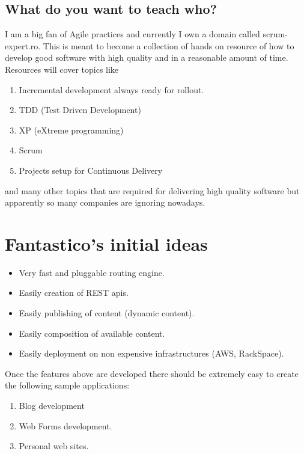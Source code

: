 \documentclass[letterpaper,10pt,english]{sphinxmanual}
\begin{document}
\subsection{What do you want to teach who?}
\label{intro:what-do-you-want-to-teach-who}
I am a big fan of Agile practices and currently I own a domain called scrum-expert.ro. This is meant to become a collection of
hands on resource of how to develop good software with high quality and in a reasonable amount of time. Resources will cover
topics like
\begin{enumerate}
\item {} 
Incremental development always ready for rollout.

\item {} 
TDD (Test Driven Development)

\item {} 
XP (eXtreme programming)

\item {} 
Scrum

\item {} 
Projects setup for Continuous Delivery

\end{enumerate}

and many other topics that are required for delivering high quality software but apparently so many companies are ignoring
nowadays.


\section{Fantastico's initial ideas}
\label{intro:fantastico-s-initial-ideas}\begin{itemize}
\item {} 
Very fast and pluggable routing engine.

\item {} 
Easily creation of REST apis.

\item {} 
Easily publishing of content (dynamic content).

\item {} 
Easily composition of available content.

\item {} 
Easily deployment on non expensive infrastructures (AWS, RackSpace).

\end{itemize}

Once the features above are developed there should be extremely easy to create the following sample applications:
\begin{enumerate}
\item {} 
Blog development

\item {} 
Web Forms development.

\item {} 
Personal web sites.

\end{enumerate}
\end{document}
